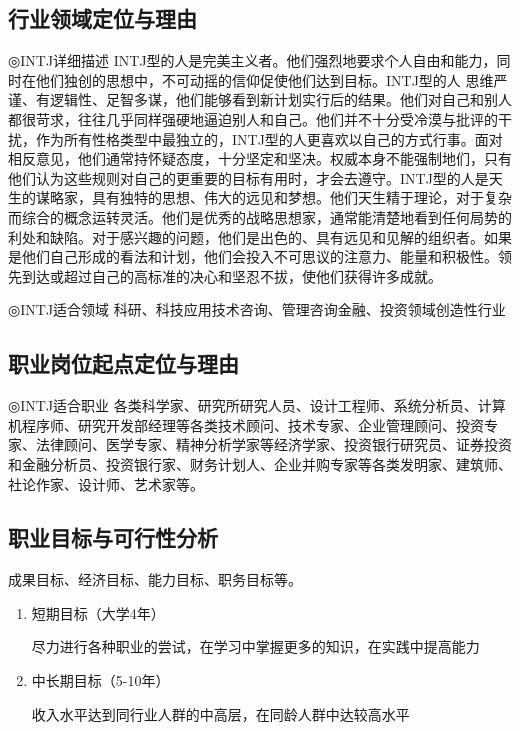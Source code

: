 \documentclass{article}
\begin{document}
\subsection{行业领域定位与理由}
◎INTJ详细描述
INTJ型的人是完美主义者。他们强烈地要求个人自由和能力，同时在他们独创的思想中，不可动摇的信仰促使他们达到目标。INTJ型的人 思维严谨、有逻辑性、足智多谋，他们能够看到新计划实行后的结果。他们对自己和别人都很苛求，往往几乎同样强硬地逼迫别人和自己。他们并不十分受冷漠与批评的干扰，作为所有性格类型中最独立的，INTJ型的人更喜欢以自己的方式行事。面对相反意见，他们通常持怀疑态度，十分坚定和坚决。权威本身不能强制地们，只有他们认为这些规则对自己的更重要的目标有用时，才会去遵守。INTJ型的人是天生的谋略家，具有独特的思想、伟大的远见和梦想。他们天生精于理论，对于复杂而综合的概念运转灵活。他们是优秀的战略思想家，通常能清楚地看到任何局势的利处和缺陷。对于感兴趣的问题，他们是出色的、具有远见和见解的组织者。如果是他们自己形成的看法和计划，他们会投入不可思议的注意力、能量和积极性。领先到达或超过自己的高标准的决心和坚忍不拔，使他们获得许多成就。\par
◎INTJ适合领域
科研、科技应用技术咨询、管理咨询金融、投资领域创造性行业\par
\par
\subsection{职业岗位起点定位与理由}
◎INTJ适合职业
各类科学家、研究所研究人员、设计工程师、系统分析员、计算机程序师、研究开发部经理等各类技术顾问、技术专家、企业管理顾问、投资专家、法律顾问、医学专家、精神分析学家等经济学家、投资银行研究员、证券投资和金融分析员、投资银行家、财务计划人、企业并购专家等各类发明家、建筑师、社论作家、设计师、艺术家等。
\par
\subsection{职业目标与可行性分析}
\par
成果目标、经济目标、能力目标、职务目标等。\par 
\begin{enumerate}[(1)]
	\item 短期目标（大学4年）\par 
	尽力进行各种职业的尝试，在学习中掌握更多的知识，在实践中提高能力 \par 
	\item 中长期目标（5-10年）\par 
	收入水平达到同行业人群的中高层，在同龄人群中达较高水平\par 
	
\end{enumerate}
\end{document}
